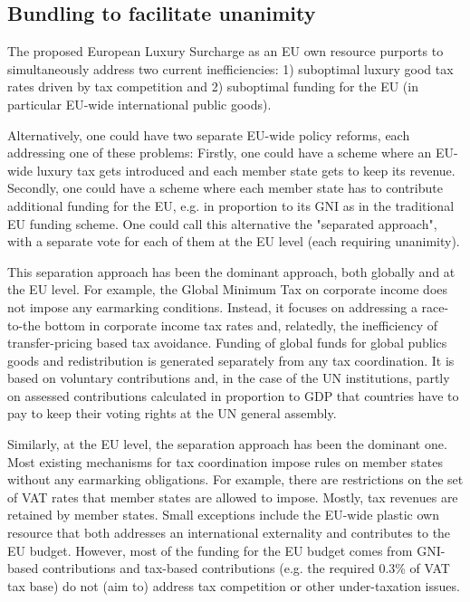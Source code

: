 \documentclass[../../main]{subfiles}
\begin{document}

\subsection{Bundling to facilitate unanimity} 

The proposed European Luxury Surcharge as an EU own resource purports to simultaneously address two current inefficiencies: 1) suboptimal luxury good tax rates driven by tax competition and 2) suboptimal funding for the EU (in particular EU-wide international public goods). 

Alternatively, one could have two separate EU-wide policy reforms, each addressing one of these problems: Firstly, one could have a scheme where an EU-wide luxury tax gets introduced and each member state gets to keep its revenue. Secondly, one could have a scheme where each member state has to contribute additional funding for the EU, e.g. in proportion to its GNI as in the traditional EU funding scheme. One could call this alternative the "separated approach", with a separate vote for each of them at the EU level (each requiring unanimity).

This separation approach has been the dominant approach, both globally and at the EU level. For example, the Global Minimum Tax on corporate income does not impose any earmarking conditions. Instead, it focuses on addressing a race-to-the bottom in corporate income tax rates and, relatedly, the inefficiency of transfer-pricing based tax avoidance. Funding of global funds for global publics goods and redistribution is generated separately from any tax coordination. It is based on voluntary contributions and, in the case of the UN institutions, partly on assessed contributions calculated in proportion to GDP that countries have to pay to keep their voting rights at the UN general assembly.

Similarly, at the EU level, the separation approach has been the dominant one. Most existing mechanisms for tax coordination impose rules on member states without any earmarking obligations. For example, there are restrictions on the set of VAT rates that member states are allowed to impose. Mostly, tax revenues are retained by member states. Small exceptions include the EU-wide plastic own resource that both addresses an international externality and contributes to the EU budget. However, most of the funding for the EU budget comes from GNI-based contributions and tax-based contributions (e.g. the required 0.3\% of VAT tax base) do not (aim to) address tax competition or other under-taxation issues.
\end{document}
